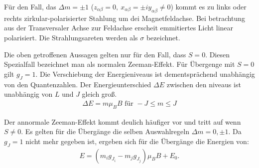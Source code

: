 Für den Fall, das $\Delta m = \pm 1$ ($z_{\alpha\beta} = 0,\ x_{\alpha\beta} = \pm i y_{\alpha\beta} \neq 0$) kommt es zu links oder rechts zirkular-polarisierter Stahlung um dei Magnetfeldachse.
Bei betrachtung aus der Transversaler Achse zur Feldachse erscheit emmitiertes Licht linear polarisiert.
Die Strahlungsareten werden als $\sigma$ bezeichnet.

Die oben getroffenen Aussagen gelten nur für den Fall, dass $S=0$.
Diesen Spezialfall bezeichnet man als normalen Zeeman-Effekt.
Für Übergenge mit $S=0$ gilt $g_J = 1$. Die Verschiebung der Energieniveaus ist dementsprächend unabhängig von den Quantenzahlen.
Der Energieunterschied $\Delta E$ zwischen den niveaus ist unabhängig von $L$ und $J$ gleich groß.
\begin{align*}
  \Delta E = m \mu_B B \text{ für } -J \leq m \leq J
\end{align*}

Der annormale Zeeman-Effekt kommt deulich häufiger vor und tritt auf wenn $S \neq 0$.
Es gelten für die Übergänge die selben Auswahlregeln $\Delta m = 0, \pm 1$.
Da $g_J = 1$ nicht mehr gegeben ist, ergeben sich für die Übergänge die Energien von:
\begin{align*}
	E=(m_ig_{J_i}-m_jg_{J_j})\mu_BB+E_0.
\end{align*}
